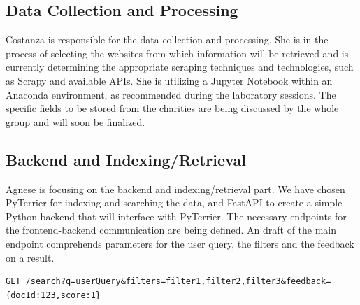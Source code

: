 \documentclass[unicode,9pt,a4paper,oneside,numbers=endperiod,openany]{scrartcl}
\begin{document}
\subsection{Data Collection and Processing}
Costanza is responsible for the data collection and processing. She is in the process of selecting the websites from which information will be retrieved and is currently determining the appropriate scraping techniques and technologies, such as Scrapy and available APIs. She is utilizing a Jupyter Notebook within an Anaconda environment, as recommended during the laboratory sessions. The specific fields to be stored from the charities are being discussed by the whole group and will soon be finalized. 

\subsection{Backend and Indexing/Retrieval}
Agnese is focusing on the backend and indexing/retrieval part.
We have chosen PyTerrier for indexing and searching the data, and FastAPI to create a simple Python backend that will interface with PyTerrier.
The necessary endpoints for the frontend-backend communication are being defined.
An draft of the main endpoint comprehends parameters for the user query, the filters and the feedback on a result.
\begin{verbatim}
GET /search?q=userQuery&filters=filter1,filter2,filter3&feedback={docId:123,score:1}
\end{verbatim}
\end{document}
